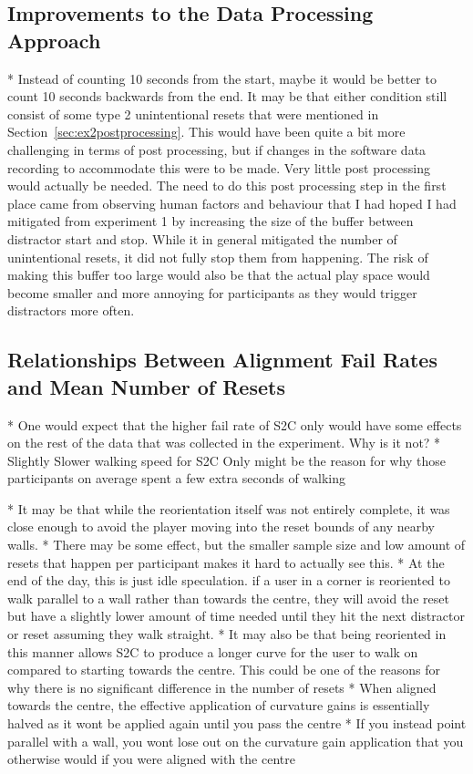 \subsection{Improvements to the Data Processing Approach}
* Instead of counting 10 seconds from the start, maybe it would be better to count 10 seconds backwards from the end. It may be that either condition still consist of some type 2 unintentional resets that were mentioned in Section~\ref{sec:ex2postprocessing}. This would have been quite a bit more challenging in terms of post processing, but if changes in the software data recording to accommodate this were to be made. Very little post processing would actually be needed. The need to do this post processing step in the first place came from observing human factors and behaviour that I had hoped I had mitigated from experiment 1 by increasing the size of the buffer between distractor start and stop. While it in general mitigated the number of unintentional resets, it did not fully stop them from happening. The risk of making this buffer too large would also be that the actual play space would become smaller and more annoying for participants as they would trigger distractors more often. 

\subsection{Relationships Between Alignment Fail Rates and Mean Number of Resets}

* One would expect that the higher fail rate of S2C only would have some effects on the rest of the data that was collected in the experiment. Why is it not?
   * Slightly Slower walking speed for S2C Only might be the reason for why those participants on average spent a few extra seconds of walking
   
   * It may be that while the reorientation itself was not entirely complete, it was close enough to avoid the player moving into the reset bounds of any nearby walls. 
   * There may be some effect, but the smaller sample size and low amount of resets that happen per participant makes it hard to actually see this. 
   * At the end of the day, this is just idle speculation. if a user in a corner is reoriented to walk parallel to a wall rather than towards the centre, they will avoid the reset but have a slightly lower amount of time needed until they hit the next distractor or reset assuming they walk straight.
      * It may also be that being reoriented in this manner allows S2C to produce a longer curve for the user to walk on compared to starting towards the centre. This could be one of the reasons for why there is no significant difference in the number of resets 
      * When aligned towards the centre, the effective application of curvature gains is essentially halved as it wont be applied again until you pass the centre
      * If you instead point parallel with a wall, you wont lose out on the curvature gain application that you otherwise would if you were aligned with the centre
      
